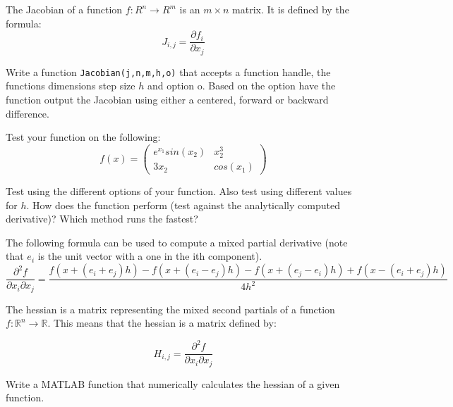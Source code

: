\begin{problem}
The Jacobian of a function $f:R^n \rightarrow R^m$ is an $m \times n$ matrix. It is defined by the formula:
\[
J_{i,j} = \frac{\partial f_i}{\partial x_j}
\]

Write a function {\tt Jacobian(j,n,m,h,o)} that accepts a function handle, the functions dimensions step size $h$ and option o. Based on the option have the function output the Jacobian using either a centered, forward or backward difference.

Test your function on the following:
\[
f(x) = 
\begin{pmatrix}
e^{x_1} sin(x_2) & x_2^3 \\
3x_2 & cos(x_1)
\end{pmatrix}
\] 

Test using the different options of your function. Also test using different values for $h$. How does the function perform (test against the analytically computed derivative)? Which method runs the fastest?
\end{problem}

\begin{problem}
The following formula can be used to compute a mixed partial derivative (note that $e_i$ is the unit vector with a one in the ith component). 
\small
\[
\frac{\partial^2 f}{\partial x_i \partial x_j} = \frac{f(x + (e_i + e_j)h) - f(x + (e_i-e_j)h) -f(x + (e_j-e_i)h) + f(x - (e_i + e_j)h)}{4h^2}
\]
\normalsize

The hessian is a matrix representing the mixed second partials of a function $f:\mathbb{R}^n \rightarrow \mathbb{R}$. This means that the hessian is a matrix defined by:

\[
H_{i,j} = \frac{\partial^2 f}{\partial x_i \partial x_j}
\]

Write a MATLAB function that numerically calculates the hessian of a given function.
\end{problem}
